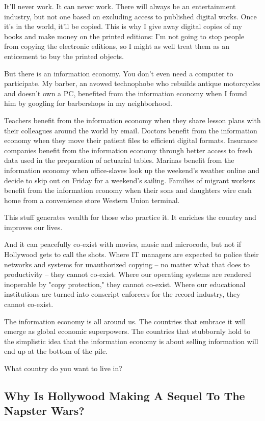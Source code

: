 It'll never work. It can never work. There will always be an
entertainment industry, but not one based on excluding access to
published digital works. Once it's in the world, it'll be copied.
This is why I give away digital copies of my books and make money
on the printed editions: I'm not going to stop people from copying
the electronic editions, so I might as well treat them as an
enticement to buy the printed objects.

But there is an information economy. You don't even need a computer
to participate. My barber, an avowed technophobe who rebuilds
antique motorcycles and doesn't own a PC, benefited from the
information economy when I found him by googling for barbershops in
my neighborhood.

Teachers benefit from the information economy when they share
lesson plans with their colleagues around the world by email.
Doctors benefit from the information economy when they move their
patient files to efficient digital formats. Insurance companies
benefit from the information economy through better access to fresh
data used in the preparation of actuarial tables. Marinas benefit
from the information economy when office-slaves look up the
weekend's weather online and decide to skip out on Friday for a
weekend's sailing. Families of migrant workers benefit from the
information economy when their sons and daughters wire cash home
from a convenience store Western Union terminal.

This stuff generates wealth for those who practice it. It enriches
the country and improves our lives.

And it can peacefully co-exist with movies, music and microcode,
but not if Hollywood gets to call the shots. Where IT managers are
expected to police their networks and systems for unauthorized
copying -- no matter what that does to productivity -- they cannot
co-exist. Where our operating systems are rendered inoperable by
"copy protection," they cannot co-exist. Where our educational
institutions are turned into conscript enforcers for the record
industry, they cannot co-exist.

The information economy is all around us. The countries that
embrace it will emerge as global economic superpowers. The
countries that stubbornly hold to the simplistic idea that the
information economy is about selling information will end up at the
bottom of the pile.

What country do you want to live in?

\subsection{Why Is Hollywood Making A Sequel To The Napster Wars?}

